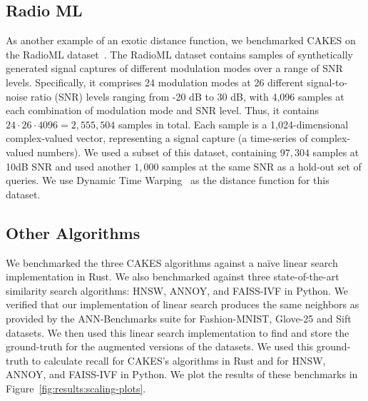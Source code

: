 \subsection{Radio ML}
\label{sec:datasets-and-benchmarks:radio-ml}

As another example of an exotic distance function, we benchmarked CAKES on the RadioML dataset~\cite{oshea2018radioml}.
The RadioML dataset contains samples of synthetically generated signal captures of different modulation modes over a range of SNR levels.
Specifically, it comprises 24 modulation modes at 26 different signal-to-noise ratio (SNR) levels ranging from -20 dB to 30 dB, with 4,096 samples at each combination of modulation mode and SNR level.
Thus, it contains $24 \cdot 26 \cdot 4096 = 2,555,504$ samples in total.
Each sample is a 1,024-dimensional complex-valued vector, representing a signal capture (a time-series of complex-valued numbers).
We used a subset of this dataset, containing $97,304$ samples at 10dB SNR and used another $1,000$ samples at the same SNR as a hold-out set of queries.
We use Dynamic Time Warping~\cite{muller2007dynamic} as the distance function for this dataset.


\subsection{Other Algorithms}
\label{sec:datasets-and-benchmarks:other-algorithms}

We benchmarked the three CAKES algorithms against a na\"ive linear search implementation in Rust.
We also benchmarked against three state-of-the-art similarity search algorithms: HNSW, ANNOY, and FAISS-IVF in Python.
We verified that our implementation of linear search produces the same neighbors as provided by the ANN-Benchmarks suite for Fashion-MNIST, Glove-25 and Sift datasets.
We then used this linear search implementation to find and store the ground-truth for the augmented versions of the datasets.
We used this ground-truth to calculate recall for CAKES's algorithms in Rust and for HNSW, ANNOY, and FAISS-IVF in Python.
We plot the results of these benchmarks in Figure~\ref{fig:results:scaling-plots}.
